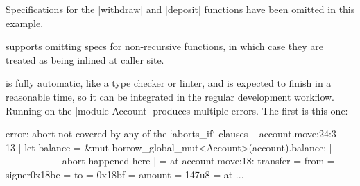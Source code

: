 Specifications for the |withdraw| and |deposit| functions have been omitted in
this example.


\MVP supports omitting specs for non-recursive functions, in
which case they are treated as being inlined at caller site.




\label{sec:RunningProver}


\MVP is fully automatic, like a type checker or linter, and is
expected to finish in a reasonable time, so it can be integrated in
the regular development workflow. Running \MVP on the |module Account| produces
multiple errors. The first is this one:

\begin{MoveDiag}
error: abort not covered by any of the `aborts_if` clauses
   -- account.move:24:3
   |
13 |       let balance = &mut borrow_global_mut<Account>(account).balance;
   |                          ----------------- abort happened here
   |
   =     at account.move:18: transfer
   =         from = signer{0x18be}
   =         to = 0x18bf
   =         amount = 147u8
   =     at ...
\end{MoveDiag}

